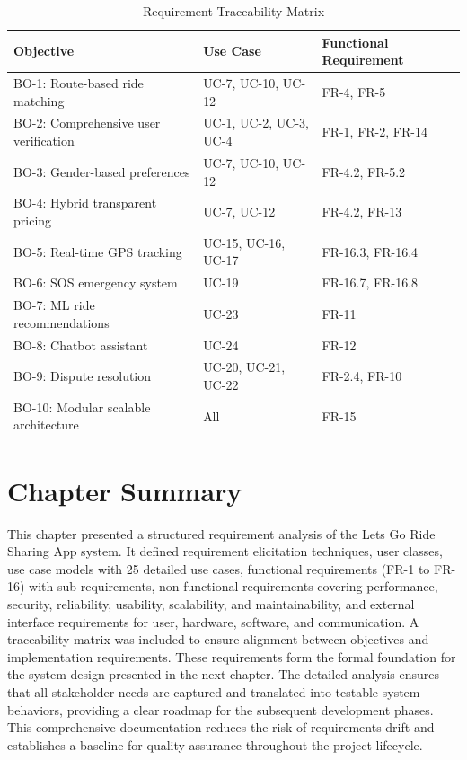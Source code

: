\begin{longtable}{|p{3cm}|p{3cm}|p{8cm}|}
\caption{Requirement Traceability Matrix}
\label{tab:rtm} \\
\hline
\rowcolor{lightgray!30}
\textbf{Objective} & \textbf{Use Case} & \textbf{Functional Requirement} \\
\hline
BO-1: Route-based ride matching & UC-7, UC-10, UC-12 & FR-4, FR-5 \\
\hline
BO-2: Comprehensive user verification & UC-1, UC-2, UC-3, UC-4 & FR-1, FR-2, FR-14 \\
\hline
BO-3: Gender-based preferences & UC-7, UC-10, UC-12 & FR-4.2, FR-5.2 \\
\hline
BO-4: Hybrid transparent pricing & UC-7, UC-12 & FR-4.2, FR-13 \\
\hline
BO-5: Real-time GPS tracking & UC-15, UC-16, UC-17 & FR-16.3, FR-16.4 \\
\hline
BO-6: SOS emergency system & UC-19 & FR-16.7, FR-16.8 \\
\hline
BO-7: ML ride recommendations & UC-23 & FR-11 \\
\hline
BO-8: Chatbot assistant & UC-24 & FR-12 \\
\hline
BO-9: Dispute resolution & UC-20, UC-21, UC-22 & FR-2.4, FR-10 \\
\hline
BO-10: Modular scalable architecture & All & FR-15 \\
\hline
\end{longtable}

\section*{Chapter Summary}

This chapter presented a structured requirement analysis of the Lets Go Ride Sharing App system. It defined requirement elicitation techniques, user classes, use case models with 25 detailed use cases, functional requirements (FR-1 to FR-16) with sub-requirements, non-functional requirements covering performance, security, reliability, usability, scalability, and maintainability, and external interface requirements for user, hardware, software, and communication. A traceability matrix was included to ensure alignment between objectives and implementation requirements. These requirements form the formal foundation for the system design presented in the next chapter. The detailed analysis ensures that all stakeholder needs are captured and translated into testable system behaviors, providing a clear roadmap for the subsequent development phases. This comprehensive documentation reduces the risk of requirements drift and establishes a baseline for quality assurance throughout the project lifecycle.

